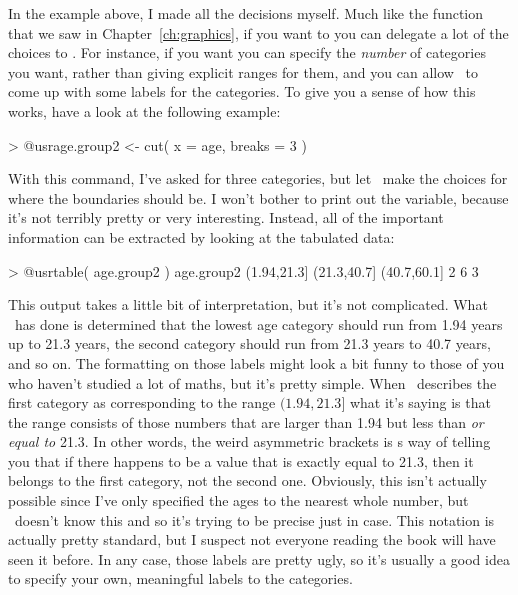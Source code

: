 In the example above, I made all the decisions myself. Much like the  function that we saw in Chapter~\ref{ch:graphics}, if you want to you can delegate a lot of the choices to \R. For instance, if you want you can specify the {\it number} of categories you want, rather than giving explicit ranges for them, and you can allow \R\ to come up with some labels for the categories. To give you a sense of how this works, have a look at the following example:
\begin{rblock1}
> @usr{age.group2 <- cut( x = age, breaks = 3 )}
\end{rblock1}
With this command, I've asked for three categories, but let \R\ make the choices for where the boundaries should be. I won't bother to print out the  variable, because it's not terribly pretty or very interesting. Instead, all of the important information can be extracted by looking at the tabulated data:
\begin{rblock1}
> @usr{table( age.group2 )}
age.group2
(1.94,21.3] (21.3,40.7] (40.7,60.1] 
          2           6           3 
\end{rblock1}
This output takes a little bit of interpretation, but it's not complicated. What \R\ has done is determined that the lowest age category should run from 1.94 years up to 21.3 years, the second category should run from 21.3 years to 40.7 years, and so on. The formatting on those labels might look a bit funny to those of you who haven't studied a lot of maths, but it's pretty simple. When \R\ describes the first category as corresponding to the range $(1.94, 21.3]$ what it's saying is that the range consists of those numbers that are larger than 1.94 but less than {\it or equal to} 21.3. In other words, the weird asymmetric brackets is \R s way of telling you that if there happens to be a value that is exactly equal to 21.3, then it belongs to the first category, not the second one. Obviously, this isn't actually possible since I've only specified the ages to the nearest whole number, but \R\ doesn't know this and so it's trying to be precise just in case. This notation is actually pretty standard, but I suspect not everyone reading the book will have seen it before. In any case, those labels are pretty ugly, so it's usually a good idea to specify your own, meaningful labels to the categories.

